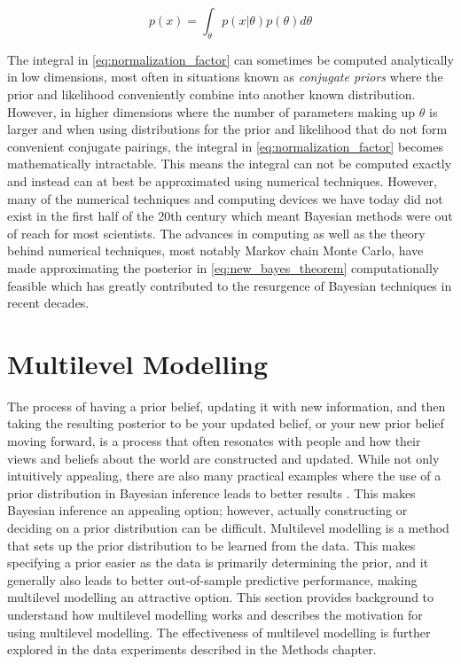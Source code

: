 \begin{equation} \label{eq:normalization_factor}
p(x) = \int_{\theta} p(x|\theta)p(\theta) d\theta
\end{equation}

The integral in \ref{eq:normalization_factor} can sometimes be computed analytically in low dimensions, most often in situations known as \textit{conjugate priors} where the prior and likelihood conveniently combine into another known distribution. However, in higher dimensions where the number of parameters making up $\theta$ is larger and when using distributions for the prior and likelihood that do not form convenient conjugate pairings, the integral in \ref{eq:normalization_factor} becomes mathematically intractable. This means the integral can not be computed exactly and instead can at best be approximated using numerical techniques. However, many of the numerical techniques and computing devices we have today did not exist in the first half of the 20th century which meant Bayesian methods were out of reach for most scientists. The advances in computing as well as the theory behind numerical techniques, most notably Markov chain Monte Carlo, have made approximating the posterior in \ref{eq:new_bayes_theorem} computationally feasible which has greatly contributed to the resurgence of Bayesian techniques in recent decades.

\section{Multilevel Modelling} \label{Multilevel_Modelling}

The process of having a prior belief, updating it with new information, and then taking the resulting posterior to be your updated belief, or your new prior belief moving forward, is a process that often resonates with people and how their views and beliefs about the world are constructed and updated. While not only intuitively appealing, there are also many practical examples where the use of a prior distribution in Bayesian inference leads to better results \cite{Schoot2021}. This makes Bayesian inference an appealing option; however, actually constructing or deciding on a prior distribution can be difficult. Multilevel modelling is a method that sets up the prior distribution to be learned from the data. This makes specifying a prior easier as the data is primarily determining the prior, and it generally also leads to better out-of-sample predictive performance, making multilevel modelling an attractive option. This section provides background to understand how multilevel modelling works and describes the motivation for using multilevel modelling. The effectiveness of multilevel modelling is further explored in the data experiments described in the Methods chapter.

